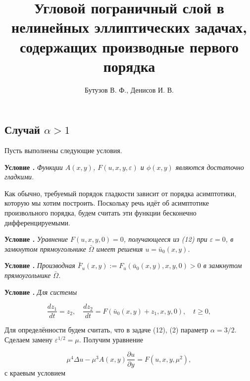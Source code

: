 \documentclass[12pt]{article}
\title{\textbf{\Large{Угловой пограничный слой в нелинейных эллиптических задачах, содержащих производные первого порядка}}}       %
\author{Бутузов В. Ф., Денисов И. В.}
\date{} %
\newcommand{\RNumb}[1]{\uppercase\expandafter{\romannumeral #1\relax}}
\begin{document}
   

\maketitle   				   %
\thispagestyle{empty}          %

\newpage                      %

\begin{center}
\section{Случай $ \alpha > 1$}
\end{center}

Пусть выполнены следующие условия.

{\bf Условие \RNumb{1}.} {\em  Функции $A(x,y)$, $F(u, x, y, \varepsilon)$ и $\phi(x, y)$ являются достаточно гладкими.}

Как обычно, требуемый порядок гладкости зависит от порядка асимптотики, которую мы хотим построить. Поскольку речь идёт об асимптотике произвольного порядка, будем считать эти функции бесконечно дифференцируемыми.

{\bf Условие \RNumb{2}.}  {\em Уравнение $F(u, x, y, 0) = 0$, получающееся из (12) при $\varepsilon = 0$, в замкнутом прямоугольнике $\bar \Omega$  имеет решения $u=\bar u_{0}(x, y)$.}

{\bf Условие \RNumb{3}.} {\em Производная $\bar F_{u}(x,y) := F_{u}(\bar u_{0}(x, y), x, y, 0) > 0$ в замкнутом прямоугольнике $\bar \Omega$. }

{\bf Условие \RNumb{4}.} {\em Для системы}

$$ \frac {dz_{1}}{dt} = z_{2}, \quad \frac {dz_{2}}{dt} = F(\bar u_{0}(x, y) + z_{1}, x, y, 0), \quad t \ge 0, $$


Для определённости будем считать, что в задаче (12), (2) параметр $\alpha = 3/2$.
Сделаем замену $\varepsilon^{1/2} = \mu$. Получим уравнение 

\begin{equation}\label{first}  \mu^{4}\Delta u - \mu^{3}A(x,y) \frac {\partial u}{\partial y} = F(u, x, y, \mu^{2}), \end{equation}
с краевым условием
\end{document}
